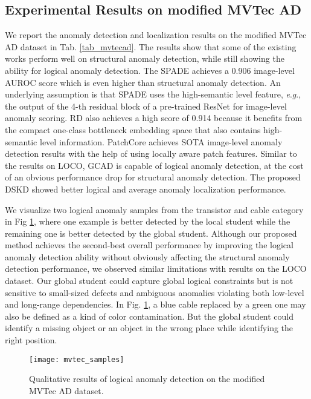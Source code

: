 \documentclass[10pt,twocolumn,letterpaper]{article}
\begin{document}
\subsection{Experimental Results on modified MVTec AD}
We report the anomaly detection and localization results on the modified MVTec AD dataset in Tab. \ref{tab_mvtecad}. The results show that some of the existing works perform well on structural anomaly detection, while still showing the ability for logical anomaly detection. The SPADE \cite{cohen2020sub}achieves a 0.906 image-level AUROC score which is even higher than structural anomaly detection. An underlying assumption is that SPADE uses the high-semantic level feature, \textit{e}.\textit{g}., the output of the 4-th residual block of a pre-trained ResNet for image-level anomaly scoring. RD \cite{deng2022anomaly} also achieves a high score of 0.914 because it benefits from the compact one-class bottleneck embedding space that also contains high-semantic level information. PatchCore achieves SOTA image-level anomaly detection results with the help of using locally aware patch features. Similar to the results on LOCO, GCAD \cite{bergmann2022beyond} is capable of logical anomaly detection, at the cost of an obvious performance drop for structural anomaly detection. The proposed DSKD showed better logical and average anomaly localization performance. 

We visualize two logical anomaly samples from the transistor and cable category in Fig \ref{fig_mvtec}, where one example is better detected by the local student while the remaining one is better detected by the global student.  Although our proposed method achieves the second-best overall performance by improving the logical anomaly detection ability without obviously affecting the structural anomaly detection performance, we observed similar limitations with results on the LOCO dataset. Our global student could capture global logical constraints but is not sensitive to small-sized defects and ambiguous anomalies violating both low-level and long-range dependencies. In Fig. \ref{fig_mvtec}, a blue cable replaced by a green one may also be defined as a kind of color contamination. But the global student could identify a missing object or an object in the wrong place while identifying the right position.

\begin{figure}
  \centering
    \texttt{[image: mvtec\_samples]}


  \caption{Qualitative results of logical anomaly detection on the modified MVTec AD dataset.}
    \label{fig_mvtec}
\end{figure}
\end{document}
